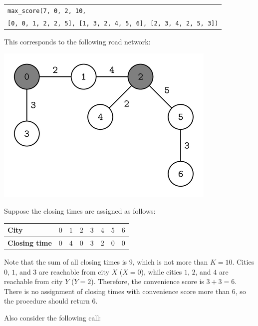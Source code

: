 \begin{center}
  \begin{tabular}{| l |}
    \hline
    \verb|max_score(7, 0, 2, 10,| \\
    \verb|[0, 0, 1, 2, 2, 5], [1, 3, 2, 4, 5, 6], [2, 3, 4, 2, 5, 3])| \\ \hline
  \end{tabular}
\end{center}


This corresponds to the following road network:

\begin{center}
  \includegraphics[scale=0.7]{0.png}
\end{center}

Suppose the closing times are assigned as follows:

\begin{center}
  \noindent
  \begin{tabular}[H!]{| l | l | l | l | l | l | l | l |}
    \hline
    \textbf{City} & $0$ & $1$ & $2$ & $3$ & $4$ & $5$ & $6$ \\ \hline
    \textbf{Closing time} & $0$ & $4$ & $0$ & $3$ & $2$ & $0$ & $0$ \\ \hline
  \end{tabular}
\end{center}

Note that the sum of all closing times is $9$, which is not more than
$K = 10$. Cities $0$, $1$, and $3$ are reachable from city $X$
($X = 0$), while cities $1$, $2$, and $4$ are reachable from
city $Y$ ($Y = 2$). Therefore, the convenience score is
$3 + 3 = 6$. There is no assignment of closing times with convenience
score more than $6$, so the procedure should return $6$.

Also consider the following call:

